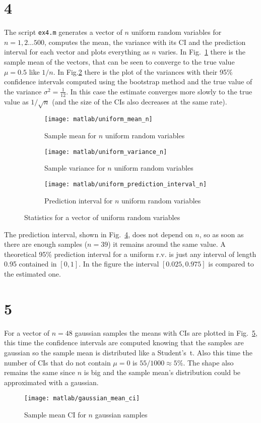 \documentclass{article}
\newcommand{\inlinecode}[1]{\lstinline[basicstyle=\ttfamily,keywordstyle={}]{#1}}
\begin{document}
\section*{4}
The script \inlinecode{ex4.m} generates a vector of $n$ uniform random
variables for $n = 1,2\dots500$, computes the mean, the variance with
its CI and the prediction interval for each vector and plots
everything as $n$ varies. In Fig.~\ref{uniform_mean} there is the
sample mean of the vectors, that can be seen to converge to the true
value $\mu=0.5$ like $1/n$. In Fig.\ref{uniform_var} there is the plot
of the variances with their 95\% confidence intervals computed using
the bootstrap method and the true value of the variance $\sigma^2 =
\frac{1}{12}$. In this case the estimate converges more slowly to the
true value as $1/\sqrt{n}$ (and the size of the CIs also decreases at
the same rate).
\begin{figure}[htbp]
  \centering
  \begin{subfigure}{.5\textwidth}
    \centering
    \texttt{[image: matlab/uniform\_mean\_n]}
    \caption{Sample mean for $n$ uniform random variables}
    \label{uniform_mean}
    \end{subfigure}%
  \begin{subfigure}{.5\textwidth}
    \centering
    \texttt{[image: matlab/uniform\_variance\_n]}
    \caption{Sample variance for $n$ uniform random variables}
    \label{uniform_var}
  \end{subfigure}
  \begin{subfigure}{.5\textwidth}
    \centering
    \texttt{[image: matlab/uniform\_prediction\_interval\_n]}
    \caption{Prediction interval for $n$ uniform random variables}
    \label{pred_int_unif}  
  \end{subfigure}
  \caption{Statistics for a vector of uniform random variables}
\end{figure}
The prediction interval, shown in Fig.~\ref{pred_int_unif}, does not
depend on $n$, so as soon as there are enough samples ($n=39$) it
remains around the same value. A theoretical 95\% prediction interval
for a uniform r.v. is just any interval of length 0.95 contained in
$[0,1]$. In the figure the interval $[0.025, 0.975]$ is compared to
the estimated one.
\section*{5}
For a vector of $n = 48$ gaussian samples the means with CIs are
plotted in Fig.~\ref{gaussian_mean_ci}, this time the confidence
intervals are computed knowing that the samples are gaussian so the
sample mean is distributed like a Student's~t. Also this time the
number of CIs that do not contain $\mu=0$ is $55/1000 \approx 5\%$.
The shape also remains the same since $n$ is big and the sample mean's
distribution could be approximated with a gaussian.
\begin{figure}[htbp]
  \centering
  \texttt{[image: matlab/gaussian\_mean\_ci]}
  \caption{Sample mean CI for $n$ gaussian samples}
  \label{gaussian_mean_ci}
\end{figure}
\end{document}
